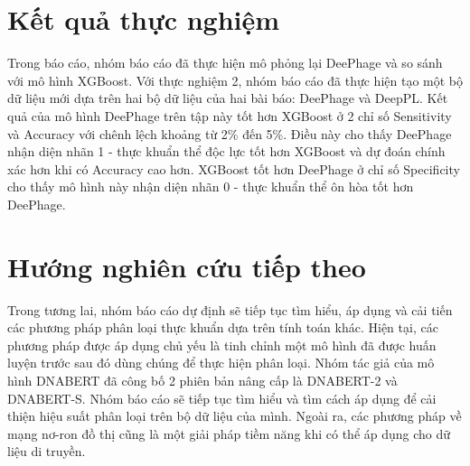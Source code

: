 \section{Kết quả thực nghiệm}
Trong báo cáo, nhóm báo cáo đã thực hiện mô phỏng lại DeePhage và so sánh với mô hình XGBoost. Với thực nghiệm 2, nhóm báo cáo đã thực hiện tạo một bộ dữ liệu mới dựa trên hai bộ dữ liệu của hai bài báo: DeePhage\cite{wu2021deephage} và DeepPL\cite{zhang2024deeppl}. Kết quả của mô hình DeePhage trên tập này tốt hơn XGBoost ở 2 chỉ số Sensitivity và Accuracy với chênh lệch khoảng từ 2\% đến 5\%. Điều này cho thấy DeePhage nhận diện nhãn 1 - thực khuẩn thể độc lực tốt hơn XGBoost và dự đoán chính xác hơn khi có Accuracy cao hơn. XGBoost tốt hơn DeePhage ở chỉ số Specificity cho thấy mô hình này nhận diện nhãn 0 - thực khuẩn thể ôn hòa tốt hơn DeePhage.

\section{Hướng nghiên cứu tiếp theo}
Trong tương lai, nhóm báo cáo dự định sẽ tiếp tục tìm hiểu, áp dụng và cải tiến các phương pháp phân loại thực khuẩn dựa trên tính toán khác. Hiện tại, các phương pháp được áp dụng chủ yếu là tinh chỉnh một mô hình đã được huấn luyện trước sau đó dùng chúng để thực hiện phân loại. Nhóm tác giả của mô hình DNABERT\cite{ji2021dnabert} đã công bố 2 phiên bản nâng cấp là DNABERT-2\cite{zhou2023dnabert} và DNABERT-S\cite{zhou2024dnabert}. Nhóm báo cáo sẽ tiếp tục tìm hiểu và tìm cách áp dụng để cải thiện hiệu suất phân loại trên bộ dữ liệu của mình. Ngoài ra, các phương pháp về mạng nơ-ron đồ thị cũng là một giải pháp tiềm năng khi có thể áp dụng cho dữ liệu di truyền.